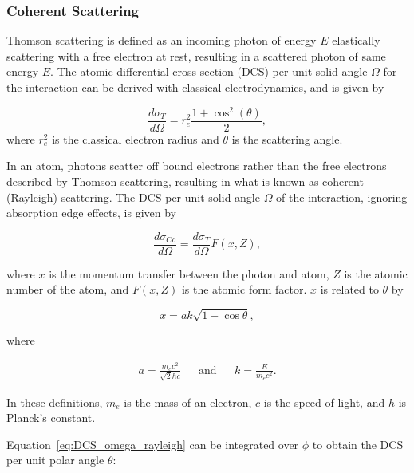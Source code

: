 \subsubsection{Coherent Scattering}

\par Thomson scattering is defined as an incoming photon of energy $E$ elastically scattering with a free electron at rest, resulting in a scattered photon of same energy $E$. The atomic differential cross-section (DCS) per unit solid angle $\Omega$ for the interaction can be derived with classical electrodynamics, and is given by

\begin{equation}
    \frac{d\sigma_T}{d\Omega} = r_e^2 \frac{1 + \cos^2(\theta)}{2},
\end{equation}
where $r_e^2$ is the classical electron radius and $\theta$ is the scattering angle.
\par In an atom, photons scatter off bound electrons rather than the free electrons described by Thomson scattering, resulting in what is known as coherent (Rayleigh) scattering. The DCS per unit solid angle $\Omega$ of the interaction, ignoring absorption edge effects, is given by

\begin{equation}
    \frac{d\sigma_{Co}}{d\Omega} = \frac{d\sigma_T}{d\Omega} F(x, Z),
    \label{eq:DCS_omega_rayleigh}
\end{equation}

where $x$ is the momentum transfer between the photon and atom, $Z$ is the atomic number of the atom, and $F(x, Z)$ is the atomic form factor. $x$ is related to $\theta$ by

\begin{equation}
    x = ak\sqrt{1 - \cos\theta},
\end{equation}

where

\begin{align}
    a = \frac{m_e c^2}{\sqrt{2}hc} && \textrm{and} && k = \frac{E}{m_e c^2}.
\end{align}

\par In these definitions, $m_e$ is the mass of an electron, $c$ is the speed of light, and $h$ is Planck's constant.

\par Equation~\ref{eq:DCS_omega_rayleigh} can be integrated over $\phi$ to obtain the DCS per unit polar angle $\theta$:

